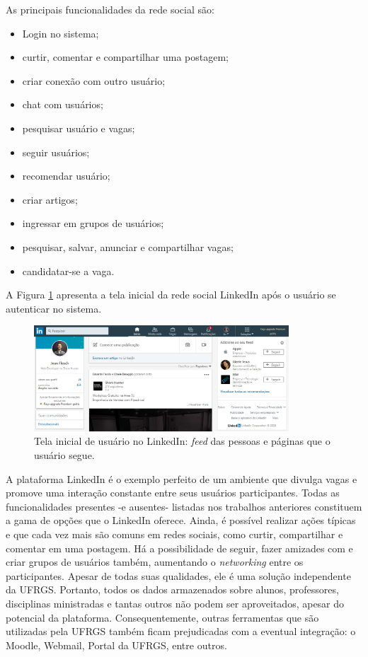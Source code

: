 As principais funcionalidades da rede social são:
\begin{itemize}
    \item Login no sistema;
    \item curtir, comentar e compartilhar uma postagem;
    \item criar conexão com outro usuário;
    \item chat com usuários;
    \item pesquisar usuário e vagas;
    \item seguir usuários;
    \item recomendar usuário;
    \item criar artigos;
    \item ingressar em grupos de usuários;
    \item pesquisar, salvar, anunciar e compartilhar vagas;
    \item candidatar-se a vaga.
\end{itemize}

A Figura \ref{telaHomeLKDIN} apresenta a tela inicial da rede social LinkedIn após o usuário se autenticar no sistema.

\begin{figure}[h]
    \caption{Tela inicial de usuário no LinkedIn: \textit{feed} das pessoas e páginas que o usuário segue.}
       	\begin{center}
            \includegraphics[width=0.85\textwidth]{figuras/rel05.png}
        \end{center}
    \label{telaHomeLKDIN}
\end{figure}

A plataforma LinkedIn é o exemplo perfeito de um ambiente que divulga vagas e promove uma interação constante entre seus usuários participantes. Todas as funcionalidades presentes -e ausentes- listadas nos trabalhos anteriores constituem a gama de opções que o LinkedIn oferece. Ainda, é possível realizar ações típicas e que cada vez mais são comuns em redes sociais, como curtir, compartilhar e comentar em uma postagem. Há a possibilidade de seguir, fazer amizades com e criar grupos de usuários também, aumentando o \textit{networking} entre os participantes. Apesar de todas suas qualidades, ele é uma solução independente da UFRGS. Portanto, todos os dados armazenados sobre alunos, professores, disciplinas ministradas e tantas outros não podem ser aproveitados, apesar do potencial da plataforma. Consequentemente, outras ferramentas que são utilizadas pela UFRGS também ficam prejudicadas com a eventual integração: o Moodle, Webmail, Portal da UFRGS, entre outros.

